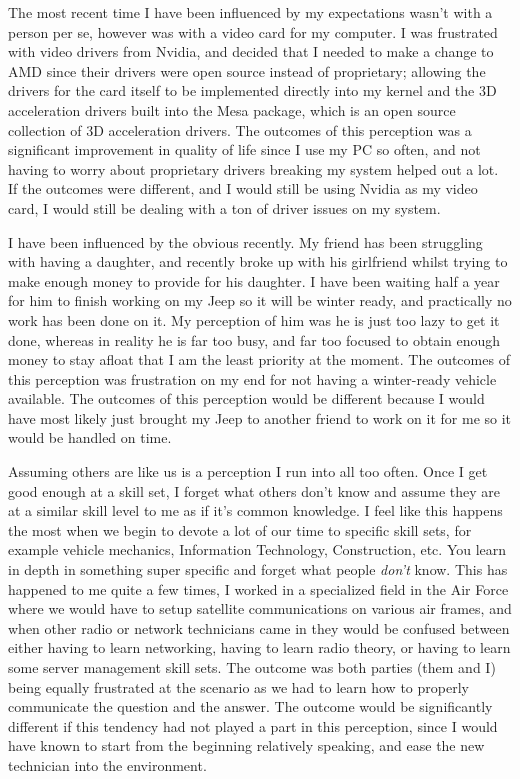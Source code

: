\documentclass[12pt]{article}
\begin{document}
\par
The most recent time I have been influenced by my expectations wasn't with a person per se, however was with a video card for my computer. I was frustrated with video drivers from Nvidia, and decided that I needed to make a change to AMD since their drivers were open source instead of proprietary; allowing the drivers for the card itself to be implemented directly into my kernel and the 3D acceleration drivers built into the Mesa package, which is an open source collection of 3D acceleration drivers. The outcomes of this perception was a significant improvement in quality of life since I use my PC so often, and not having to worry about proprietary drivers breaking my system helped out a lot. If the outcomes were different, and I would still be using Nvidia as my video card, I would still be dealing with a ton of driver issues on my system.
\par
I have been influenced by the obvious recently. My friend has been struggling with having a daughter, and recently broke up with his girlfriend whilst trying to make enough money to provide for his daughter. I have been waiting half a year for him to finish working on my Jeep so it will be winter ready, and practically no work has been done on it. My perception of him was he is just too lazy to get it done, whereas in reality he is far too busy, and far too focused to obtain enough money to stay afloat that I am the least priority at the moment. The outcomes of this perception was frustration on my end for not having a winter-ready vehicle available. The outcomes of this perception would be different because I would have most likely just brought my Jeep to another friend to work on it for me so it would be handled on time.
\par
Assuming others are like us is a perception I run into all too often. Once I get good enough at a skill set, I forget what others don't know and assume they are at a similar skill level to me as if it's common knowledge. I feel like this happens the most when we begin to devote a lot of our time to specific skill sets, for example vehicle mechanics, Information Technology, Construction, etc. You learn in depth in something super specific and forget what people \emph{don't} know. This has happened to me quite a few times, I worked in a specialized field in the Air Force where we would have to setup satellite communications on various air frames, and when other radio or network technicians came in they would be confused between either having to learn networking, having to learn radio theory, or having to learn some server management skill sets. The outcome was both parties (them and I) being equally frustrated at the scenario as we had to learn how to properly communicate the question and the answer. The outcome would be significantly different if this tendency had not played a part in this perception, since I would have known to start from the beginning relatively speaking, and ease the new technician into the environment.
\end{document}
